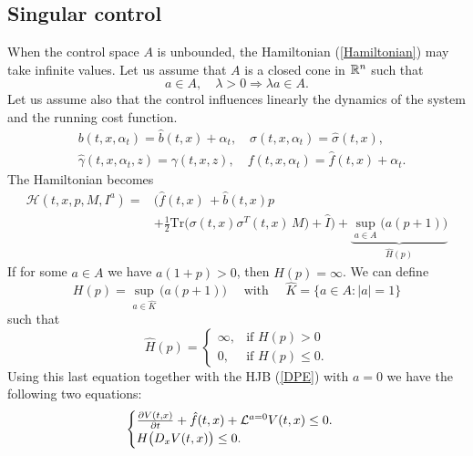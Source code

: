 \subsection{Singular control}

When the control space $A$ is unbounded, the Hamiltonian (\ref{Hamiltonian}) may take infinite values. Let us assume that $A$ is a closed cone in $\mathbb{R}^n$ such that 
\begin{equation}\label{unbounded_set}
 a \in A, \quad \lambda > 0 \Longrightarrow \lambda a \in A.
\end{equation}
Let us assume also that the control influences linearly the dynamics of the system and the running cost function.
\begin{align}\label{linear_control}
 & b(t,x,\alpha_t) = \hat b(t,x) + \alpha_t, \quad \sigma(t,x,\alpha_t) = \hat \sigma(t,x), \\ 
 & \hat \gamma(t,x,\alpha_t,z) = \gamma(t,x,z), \quad f(t,x,\alpha_t) = \hat f(t,x) + \alpha_t. 
\end{align}
The Hamiltonian becomes
\begin{align*}
 \mathcal{H}(t,x,p,M,I^a) =& \biggl( \hat f(t,x) \, + \hat b(t,x) p \\ \nonumber
              &+ \frac{1}{2} \mbox{Tr} \bigl( \sigma(t,x)\sigma^T(t,x) \, M \bigr) +\hat I \biggr) + \underbrace{\sup_{a \in A} \biggl( a(p + 1) \biggr) }_{\hat H(p)} 
\end{align*}
If for some $a\in A$ we have $a(1+p)>0$, then $\hat H(p) = \infty$. We can define 
\begin{equation}
 H(p) = \sup_{a \in \hat K} \biggl( a(p + 1) \biggr) \quad \mbox{ with } \quad \hat K = \{ a \in A: |a|=1 \}
\end{equation}
such that
\begin{equation}
\hat H(p) = \begin{cases} 
 \infty, & \mbox{if } H(p) >0 \\ 
  0,     & \mbox{if } H(p) \leq 0 . 
\end{cases} 
\end{equation}
Using this last equation together with the HJB (\ref{DPE}) with $a=0$ we have the following two equations:
\begin{equation}
\begin{cases}
 \frac{\partial V(t,x)}{\partial t} + \hat f(t,x) + \mathcal{L}^{a=0}V(t,x)  \leq 0. \\
 H\bigl( D_x V(t,x) \bigr) \leq 0.
\end{cases}
\end{equation}
